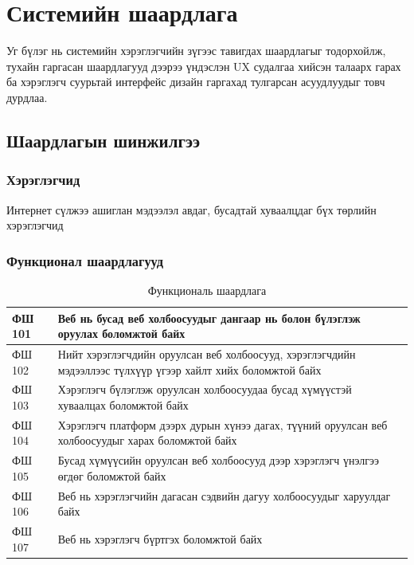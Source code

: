 \chapter{Системийн шаардлага}

Уг бүлэг нь системийн хэрэглэгчийн зүгээс тавигдах шаардлагыг тодорхойлж, тухайн гаргасан шаардлагууд дээрээ үндэслэн UX судалгаа хийсэн талаарх гарах ба хэрэглэгч суурьтай интерфейс дизайн гаргахад тулгарсан асуудлуудыг товч дурдлаа.

\section{Шаардлагын шинжилгээ}

\subsection{Хэрэглэгчид}

Интернет сүлжээ ашиглан мэдээлэл авдаг, бусадтай хуваалцдаг бүх төрлийн хэрэглэгчид

\subsection{Функционал шаардлагууд}

\begin{table}[h]
	\centering
	\caption{Функциональ шаардлага}
	\begin{tabular}{ |p{2cm}|p{13cm}| }
	\hline
	ФШ 101 &  Веб нь бусад веб холбоосуудыг дангаар нь болон бүлэглэж оруулах боломжтой байх \\ \hline
	ФШ 102 &  Нийт хэрэглэгчдийн оруулсан веб холбоосууд, хэрэглэгчдийн мэдээллээс түлхүүр үгээр хайлт хийх боломжтой байх \\ \hline
	ФШ 103 &  Хэрэглэгч бүлэглэж оруулсан холбоосуудаа бусад хүмүүстэй хуваалцах боломжтой байх \\ \hline
	ФШ 104 &  Хэрэглэгч платформ дээрх дурын хүнээ дагах, түүний оруулсан веб холбоосуудыг харах боломжтой байх \\ \hline
	ФШ 105 &  Бусад хүмүүсийн оруулсан веб холбоосууд дээр хэрэглэгч үнэлгээ өгдөг боломжтой байх \\ \hline
	ФШ 106 &  Веб нь хэрэглэгчийн дагасан сэдвийн дагуу холбоосуудыг харуулдаг байх \\  \hline
	ФШ 107 &  Веб нь хэрэглэгч бүртгэх боломжтой байх \\ \hline
\end{tabular}
\end{table}

